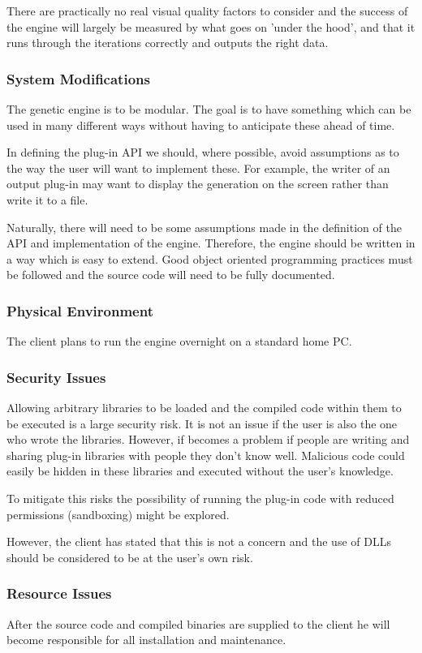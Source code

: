 There are practically no real visual quality factors to consider and the success of the engine will largely be measured by what goes on 'under the hood', and that it runs through the iterations correctly and outputs the right data.

\subsubsection{System Modifications}
The genetic engine is to be modular. The goal is to have something which can be used in many different ways without having to anticipate these ahead of time.

In defining the plug-in API we should, where possible, avoid assumptions as to the way the user will want to implement these. For example, the writer of an output plug-in may want to display the generation on the screen rather than write it to a file. 

Naturally, there will need to be some assumptions made in the definition of the API and implementation of the engine. Therefore, the engine should be written in a way which is easy to extend. Good object oriented programming practices must be followed and the source code will need to be fully documented.

\subsubsection{Physical Environment}
The client plans to run the engine overnight on a standard home PC.

\subsubsection{Security Issues}
Allowing arbitrary libraries to be loaded and the compiled code within them to be executed is a large security risk. It is not an issue if the user is also the one who wrote the libraries. However, if becomes a problem if people are writing and sharing plug-in libraries with people they don't know well. Malicious code could easily be hidden in these libraries and executed without the user's knowledge.

To mitigate this risks the possibility of running the plug-in code with reduced permissions (sandboxing) might be explored. 

However, the client has stated that this is not a concern and the use of DLLs should be considered to be at the user's own risk.

\subsubsection{Resource Issues}
After the source code and compiled binaries are supplied to the client he will become responsible for all installation and maintenance.

